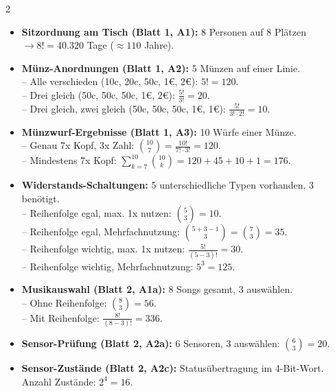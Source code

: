 \documentclass[a4paper, 9pt]{extarticle}
\begin{document}
\begin{multicols*}{2}
\begin{tcolorbox}[title={Übungsblatt-Katalog: Kombinatorik}, colframe=combblue, colback=combblue!5, colbacktitle=combblue]
\begin{itemize}
    \item \textbf{Sitzordnung am Tisch (Blatt 1, A1):} 8 Personen auf 8 Plätzen $\rightarrow 8! = 40.320$ Tage ($\approx 110$ Jahre).
    \item \textbf{Münz-Anordnungen (Blatt 1, A2):} 5 Münzen auf einer Linie.
    \\-- Alle verschieden (10c, 20c, 50c, 1\euro, 2\euro): $5! = 120$.
    \\-- Drei gleich (50c, 50c, 50c, 1\euro, 2\euro): $\frac{5!}{3!} = 20$.
    \\-- Drei gleich, zwei gleich (50c, 50c, 50c, 1\euro, 1\euro): $\frac{5!}{3! \cdot 2!} = 10$.
    \item \textbf{Münzwurf-Ergebnisse (Blatt 1, A3):} 10 Würfe einer Münze.
    \\-- Genau 7x Kopf, 3x Zahl: $\binom{10}{7} = \frac{10!}{7! \cdot 3!} = 120$.
    \\-- Mindestens 7x Kopf: $\sum_{k=7}^{10} \binom{10}{k} = 120 + 45 + 10 + 1 = 176$.
    \item \textbf{Widerstands-Schaltungen:} 5 unterschiedliche Typen vorhanden, 3 benötigt.
    \\-- Reihenfolge egal, max. 1x nutzen: $\binom{5}{3} = 10$.
    \\-- Reihenfolge egal, Mehrfachnutzung: $\binom{5+3-1}{3} = \binom{7}{3} = 35$.
    \\-- Reihenfolge wichtig, max. 1x nutzen: $\frac{5!}{(5-3)!} = 30$.
    \\-- Reihenfolge wichtig, Mehrfachnutzung: $5^3 = 125$.
    \item \textbf{Musikauswahl (Blatt 2, A1a):} 8 Songs gesamt, 3 auswählen.
    \\-- Ohne Reihenfolge: $\binom{8}{3} = 56$.
    \\-- Mit Reihenfolge: $\frac{8!}{(8-3)!} = 336$.
    \item \textbf{Sensor-Prüfung (Blatt 2, A2a):} 6 Sensoren, 3 auswählen: $\binom{6}{3} = 20$.
    \item \textbf{Sensor-Zustände (Blatt 2, A2c):} Statusübertragung im 4-Bit-Wort. Anzahl Zustände: $2^4 = 16$.
\end{itemize}
\end{tcolorbox}


\end{multicols*}
\end{document}
